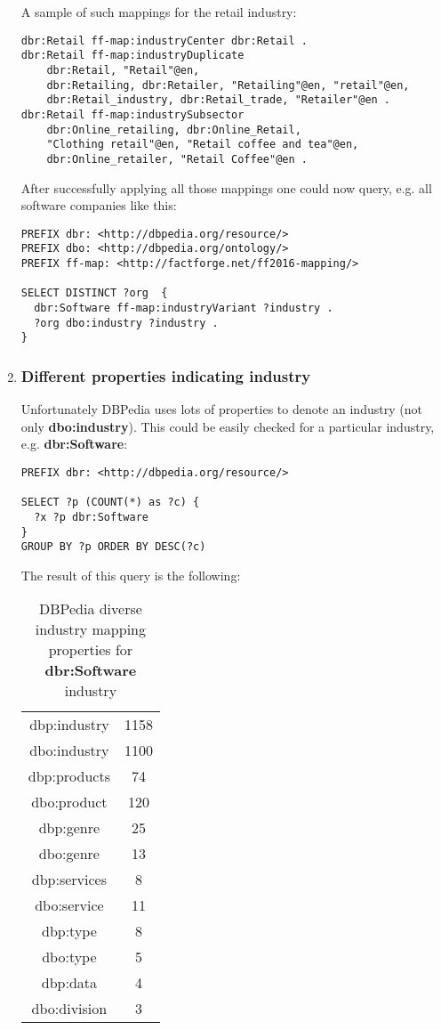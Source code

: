 \begin{enumerate}
    A sample of such mappings for the retail industry:
\begin{verbatim}
dbr:Retail ff-map:industryCenter dbr:Retail .
dbr:Retail ff-map:industryDuplicate 
    dbr:Retail, "Retail"@en, 
    dbr:Retailing, dbr:Retailer, "Retailing"@en, "retail"@en, 
    dbr:Retail_industry, dbr:Retail_trade, "Retailer"@en .
dbr:Retail ff-map:industrySubsector 
    dbr:Online_retailing, dbr:Online_Retail, 
    "Clothing retail"@en, "Retail coffee and tea"@en, 
    dbr:Online_retailer, "Retail Coffee"@en .
\end{verbatim}
    
    After successfully applying all those mappings one could now query, e.g. all software companies like this:
    
\begin{verbatim}
PREFIX dbr: <http://dbpedia.org/resource/>
PREFIX dbo: <http://dbpedia.org/ontology/>
PREFIX ff-map: <http://factforge.net/ff2016-mapping/>

SELECT DISTINCT ?org  {
  dbr:Software ff-map:industryVariant ?industry .
  ?org dbo:industry ?industry .
}
\end{verbatim}

    \item \subsubsection{Different properties indicating industry}
    
    Unfortunately DBPedia uses lots of properties to denote an industry (not only \textbf{dbo:industry}).
    This could be easily checked for a particular industry, e.g. \textbf{dbr:Software}:
    
\begin{verbatim}
PREFIX dbr: <http://dbpedia.org/resource/>

SELECT ?p (COUNT(*) as ?c) {
  ?x ?p dbr:Software
} 
GROUP BY ?p ORDER BY DESC(?c)    
\end{verbatim}
    The result of this query is the following:

\begin{table}[h!]
\centering
\begin{tabular}{||c|c||} 
\hline
dbp:industry & 1158 \\
dbo:industry & 1100 \\
dbp:products & 74 \\
dbo:product	& 120 \\
dbp:genre & 25 \\
dbo:genre & 13 \\
dbp:services & 8 \\
dbo:service	& 11 \\
dbp:type & 8 \\
dbo:type & 5 \\
dbp:data & 4 \\
dbo:division & 3 \\ [1ex]
\hline
\end{tabular}
\caption{DBPedia diverse industry mapping properties for \textbf{dbr:Software} industry}
\label{table:1}
\end{table}


\end{enumerate}
